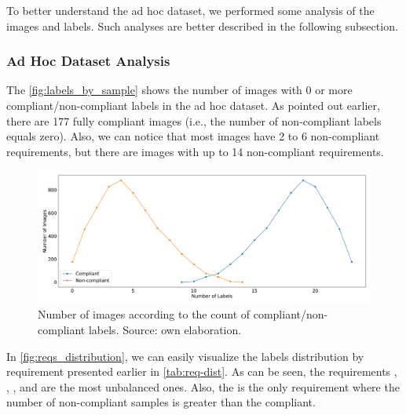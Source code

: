 
To better understand the ad hoc dataset, we performed some analysis of the images and labels. Such analyses are better described in the following subsection.



\subsubsection{Ad Hoc Dataset Analysis}

The \autoref{fig:labels_by_sample} shows the number of images with 0 or more compliant/non-compliant labels in the ad hoc dataset. As pointed out earlier, there are 177 fully compliant images (i.e., the number of non-compliant labels equals zero). Also, we can notice that most images have 2 to 6 non-compliant requirements, but there are images with up to 14 non-compliant requirements.

\begin{figure}
\centering
\includegraphics[width=\linewidth]{images/labels_by_sample.pdf}
\caption{Number of images according to the count of compliant/non-compliant labels. Source: own elaboration.}
\label{fig:labels_by_sample}
\end{figure}

In \autoref{fig:reqs_distribution}, we can easily visualize the labels distribution by requirement presented earlier in \autoref{tab:req-dist}. As can be seen, the requirements \citeReq{\inkmarked}, \citeReq{\washedout}, \citeReq{\framestooheavy}, and \citeReq{\otherfacesortoys} are the most unbalanced ones. Also, the \citeReq{\unnaturalskintone} is the only requirement where the number of non-compliant samples is greater than the compliant.

